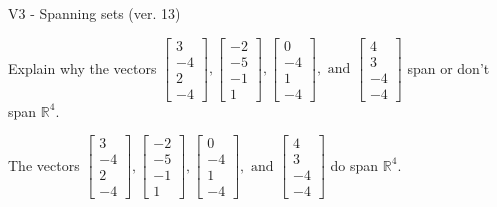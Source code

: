 \begin{exercise}
  \begin{exerciseTitle}V3 - Spanning sets (ver. 13)\end{exerciseTitle}
  \begin{exerciseStatement}
    Explain why the vectors \(\left[\begin{array}{r}
3 \\
-4 \\
2 \\
-4
\end{array}\right] , \left[\begin{array}{r}
-2 \\
-5 \\
-1 \\
1
\end{array}\right] , \left[\begin{array}{r}
0 \\
-4 \\
1 \\
-4
\end{array}\right] , \text{ and } \left[\begin{array}{r}
4 \\
3 \\
-4 \\
-4
\end{array}\right]\) span or don't span \(\mathbb{R}^4\). 
	


  \end{exerciseStatement}
  \begin{exerciseAnswer}
   The vectors \(\left[\begin{array}{r}
3 \\
-4 \\
2 \\
-4
\end{array}\right] , \left[\begin{array}{r}
-2 \\
-5 \\
-1 \\
1
\end{array}\right] , \left[\begin{array}{r}
0 \\
-4 \\
1 \\
-4
\end{array}\right] , \text{ and } \left[\begin{array}{r}
4 \\
3 \\
-4 \\
-4
\end{array}\right]\) 
  	 do  
	span \(\mathbb{R}^4\).
  


  \end{exerciseAnswer}
\end{exercise}